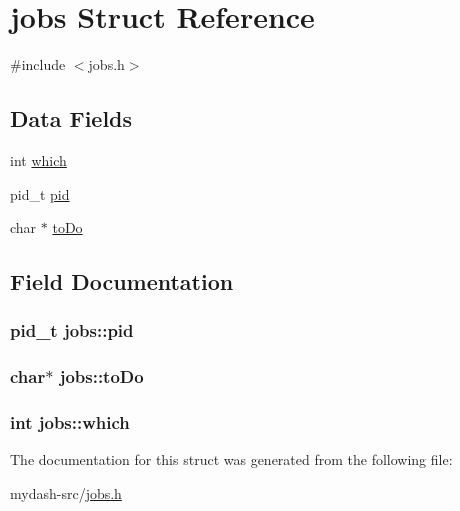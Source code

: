 \hypertarget{structjobs}{}\section{jobs Struct Reference}
\label{structjobs}


{\ttfamily \#include $<$jobs.\+h$>$}

\subsection*{Data Fields}
\begin{DoxyCompactItemize}
\item 
int \hyperlink{structjobs_a4fbc3249455114d55c73f693a4931771}{which}
\item 
pid\+\_\+t \hyperlink{structjobs_a6f74249a476d051f10ee22da89b341eb}{pid}
\item 
char $\ast$ \hyperlink{structjobs_a6e530375648e1fb1a9832cdf80ba3bfe}{to\+Do}
\end{DoxyCompactItemize}


\subsection{Field Documentation}
\hypertarget{structjobs_a6f74249a476d051f10ee22da89b341eb}{}
\subsubsection[{pid}]{\setlength{\rightskip}{0pt plus 5cm}pid\+\_\+t jobs\+::pid}\label{structjobs_a6f74249a476d051f10ee22da89b341eb}
\hypertarget{structjobs_a6e530375648e1fb1a9832cdf80ba3bfe}{}
\subsubsection[{to\+Do}]{\setlength{\rightskip}{0pt plus 5cm}char$\ast$ jobs\+::to\+Do}\label{structjobs_a6e530375648e1fb1a9832cdf80ba3bfe}
\hypertarget{structjobs_a4fbc3249455114d55c73f693a4931771}{}
\subsubsection[{which}]{\setlength{\rightskip}{0pt plus 5cm}int jobs\+::which}\label{structjobs_a4fbc3249455114d55c73f693a4931771}


The documentation for this struct was generated from the following file\+:\begin{DoxyCompactItemize}
\item 
mydash-\/src/\hyperlink{jobs_8h}{jobs.\+h}\end{DoxyCompactItemize}
